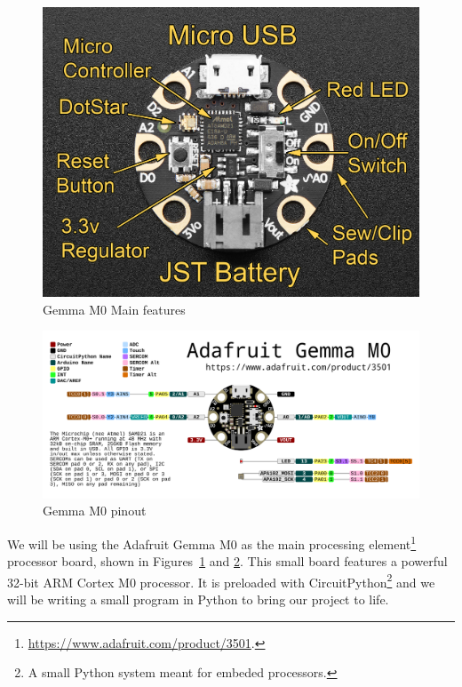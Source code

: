\documentclass[letterpaper,twoside,12pt]{article}
\begin{document}
\begin{figure}[hbpt]\begin{centering}%
\includegraphics[width=5in]{gemma_guide.jpg}
\caption{Gemma M0 Main features}
\label{fig:gemmaguide}
\end{centering}\end{figure}
\begin{figure}[hbpt]\begin{centering}%
\includegraphics[width=5in]{adafruit_gemma_Adafruit_GEMMA_M0_pinout.png}
\caption{Gemma M0 pinout}
\label{fig:gemmapinout}
\end{centering}\end{figure}
We will be using the Adafruit Gemma M0 as the main processing element\footnote{
\url{https://www.adafruit.com/product/3501}.} processor board, shown in
Figures~\ref{fig:gemmaguide} and \ref{fig:gemmapinout}. This small board
features a powerful 32-bit ARM Cortex M0 processor. It is preloaded with
CircuitPython\footnote{A small Python system meant for embeded processors.} 
and we will be writing a small program in Python to bring our project to life.
\clearpage
\end{document}
